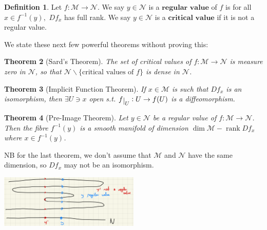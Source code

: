 \documentclass[10pt]{article}
\theoremstyle{plain}
\newtheorem{thm}{Theorem}[section] %
\theoremstyle{definition}
\newtheorem{defn}[thm]{Definition} %
\newcommand{\man}{\mathcal{M}}
\newcommand{\nan}{\mathcal{N}}
\def\restrict#1{\raise-.5ex\hbox{\ensuremath|}_{#1}}
\DeclareMathOperator{\rank}{rank}
\begin{document}
\begin{defn}
Let $f:\man\to\nan$. We say $y\in \nan$ is a $\textbf{regular value}$ of $f$ is for all $x\in f^{-1}(y),$ $Df_x$ has full rank. We say $y\in\nan$ is a $\textbf{critical value}$ if it is not a regular value.
\end{defn}
We state these next few powerful theorems without proving this:
\begin{thm}[Sard's Theorem]
The set of critical values of $f : \man \to \nan$ is measure zero in $\nan$, so that $\nan \backslash \{\text{critical values of } f\}$ is dense in $\nan$.
\end{thm}

\begin{thm}[Implicit Function Theorem]
If $x\in \man$ is such that $Df_x$ is an isomorphism, then $\exists U \ni x$ open s.t. $f\restrict{U} : U \to f(U)$ is a diffeomorphism.
\end{thm}

\begin{thm}[Pre-Image Theorem]
Let $y\in \nan$ be a regular value of $f : \man \to \nan$. Then the fibre $f^{-1}(y)$ is a smooth manifold of dimension $\dim \man - \rank Df_x$ where $x\in f^{-1}(y)$.
\end{thm}
NB for the last theorem, we don't assume that $\man$ and $\nan$ have the same dimension, so $Df_x$ may not be an isomorphism.
\begin{center}
    \includegraphics[width =0.5\textwidth]{RegularValues.png}
\end{center}
\end{document}

